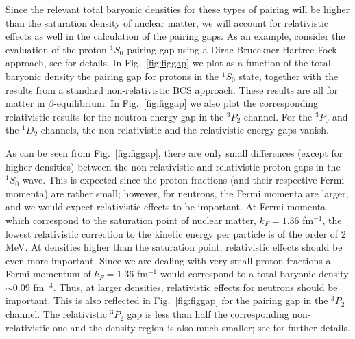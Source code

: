 \documentclass[preprint,rmp,aps,floatfix]{revtex4}
\begin{document}
Since the relevant total baryonic densities for these types of
pairing will be higher than the saturation
density of nuclear matter, we will account for relativistic
effects as well in the calculation of the pairing gaps.
As an example, consider the evaluation of the proton
$^1S_0$ pairing gap using a Dirac-Brueckner-Hartree-Fock  approach,
see \cite{elga96,pair1} for details.
In Fig.\ \ref{fig:figgap} we plot as a function of the total baryonic 
density the pairing gap for protons in the $^1S_0$
state, together with the results from a standard non-relativistic 
BCS approach.
These results are all 
for matter in $\beta$-equilibrium. In Fig.\ \ref{fig:figgap} 
we also plot the 
corresponding relativistic 
results for the neutron energy gap in the $^3P_2$ channel. 
For the 
$^3P_0$ and the $^1D_2$ channels,
the non-relativistic and the relativistic
energy gaps vanish. 

As can be seen from Fig.\ \ref{fig:figgap}, there are only small
differences (except for higher densities) between the non-relativistic
and relativistic proton gaps in the $^1S_0$ wave.
This is expected since the proton fractions (and their respective Fermi
momenta) are rather small; however,
for neutrons, 
the Fermi momenta are larger, and we would 
expect relativistic effects to be important. At Fermi momenta
which correspond to the
saturation point of nuclear matter, $k_F=1.36$ fm$^{-1}$,
the lowest relativistic correction to the kinetic energy per 
particle is of the order of 2 MeV. 
At densities higher than the saturation
point, relativistic effects should be even 
more important.
Since we are dealing with
very small proton fractions a Fermi momentum
of $k_F=1.36$ fm$^{-1}$ would correspond to a total baryonic 
density $\sim 0.09$  fm$^{-3}$. Thus, at larger densities,
relativistic effects for neutrons should
be important.
This is also reflected in Fig.\ \ref{fig:figgap} for the pairing
gap in the $^3P_2$ channel.
The relativistic $^3P_2$ gap is less  than half
the corresponding non-relativistic one and the 
density region is also much smaller; 
see  \cite{pair1} for further details.
\end{document}
